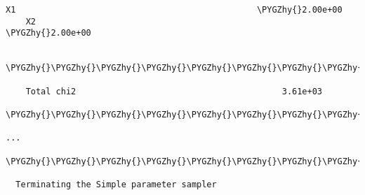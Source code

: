 \documentclass[letterpaper,10pt,english]{sphinxmanual}
\def\PYGZhy{\char`\-}
\begin{document}
\begin{Verbatim}[commandchars=\\\{\}]
    X1                                                \PYGZhy{}2.00e+00
    X2                                                \PYGZhy{}2.00e+00

    \PYGZhy{}\PYGZhy{}\PYGZhy{}\PYGZhy{}\PYGZhy{}\PYGZhy{}\PYGZhy{}\PYGZhy{}\PYGZhy{}\PYGZhy{}\PYGZhy{}\PYGZhy{}\PYGZhy{}\PYGZhy{}\PYGZhy{}\PYGZhy{}\PYGZhy{}\PYGZhy{}\PYGZhy{}\PYGZhy{}\PYGZhy{}\PYGZhy{}\PYGZhy{}\PYGZhy{}\PYGZhy{}\PYGZhy{}\PYGZhy{}\PYGZhy{}\PYGZhy{}\PYGZhy{}\PYGZhy{}\PYGZhy{}\PYGZhy{}\PYGZhy{}\PYGZhy{}\PYGZhy{}\PYGZhy{}\PYGZhy{}\PYGZhy{}\PYGZhy{}\PYGZhy{}\PYGZhy{}\PYGZhy{}\PYGZhy{}\PYGZhy{}\PYGZhy{}\PYGZhy{}\PYGZhy{}\PYGZhy{}\PYGZhy{}\PYGZhy{}\PYGZhy{}\PYGZhy{}\PYGZhy{}\PYGZhy{}\PYGZhy{}\PYGZhy{}\PYGZhy{}\PYGZhy{}

    Total chi2                                         3.61e+03

\PYGZhy{}\PYGZhy{}\PYGZhy{}\PYGZhy{}\PYGZhy{}\PYGZhy{}\PYGZhy{}\PYGZhy{}\PYGZhy{}\PYGZhy{}\PYGZhy{}\PYGZhy{}\PYGZhy{}\PYGZhy{}\PYGZhy{}\PYGZhy{}\PYGZhy{}\PYGZhy{}\PYGZhy{}\PYGZhy{}\PYGZhy{}\PYGZhy{}\PYGZhy{}\PYGZhy{}\PYGZhy{}\PYGZhy{}\PYGZhy{}\PYGZhy{}\PYGZhy{}\PYGZhy{}\PYGZhy{}\PYGZhy{}\PYGZhy{}\PYGZhy{}\PYGZhy{}\PYGZhy{}\PYGZhy{}\PYGZhy{}\PYGZhy{}\PYGZhy{}\PYGZhy{}\PYGZhy{}\PYGZhy{}\PYGZhy{}\PYGZhy{}\PYGZhy{}\PYGZhy{}\PYGZhy{}\PYGZhy{}\PYGZhy{}\PYGZhy{}\PYGZhy{}\PYGZhy{}\PYGZhy{}\PYGZhy{}\PYGZhy{}\PYGZhy{}\PYGZhy{}\PYGZhy{}\PYGZhy{}\PYGZhy{}\PYGZhy{}\PYGZhy{}\PYGZhy{}\PYGZhy{}\PYGZhy{}\PYGZhy{}\PYGZhy{}\PYGZhy{}\PYGZhy{}\PYGZhy{}\PYGZhy{}\PYGZhy{}\PYGZhy{}\PYGZhy{}\PYGZhy{}\PYGZhy{}\PYGZhy{}\PYGZhy{}\PYGZhy{}\PYGZhy{}\PYGZhy{}\PYGZhy{}\PYGZhy{}\PYGZhy{}\PYGZhy{}\PYGZhy{}

...

\PYGZhy{}\PYGZhy{}\PYGZhy{}\PYGZhy{}\PYGZhy{}\PYGZhy{}\PYGZhy{}\PYGZhy{}\PYGZhy{}\PYGZhy{}\PYGZhy{}\PYGZhy{}\PYGZhy{}\PYGZhy{}\PYGZhy{}\PYGZhy{}\PYGZhy{}\PYGZhy{}\PYGZhy{}\PYGZhy{}\PYGZhy{}\PYGZhy{}\PYGZhy{}\PYGZhy{}\PYGZhy{}\PYGZhy{}\PYGZhy{}\PYGZhy{}\PYGZhy{}\PYGZhy{}\PYGZhy{}\PYGZhy{}\PYGZhy{}\PYGZhy{}\PYGZhy{}\PYGZhy{}\PYGZhy{}\PYGZhy{}\PYGZhy{}\PYGZhy{}\PYGZhy{}\PYGZhy{}\PYGZhy{}\PYGZhy{}\PYGZhy{}\PYGZhy{}\PYGZhy{}\PYGZhy{}\PYGZhy{}\PYGZhy{}\PYGZhy{}\PYGZhy{}\PYGZhy{}\PYGZhy{}\PYGZhy{}\PYGZhy{}\PYGZhy{}\PYGZhy{}\PYGZhy{}\PYGZhy{}\PYGZhy{}\PYGZhy{}\PYGZhy{}\PYGZhy{}\PYGZhy{}\PYGZhy{}\PYGZhy{}\PYGZhy{}\PYGZhy{}\PYGZhy{}\PYGZhy{}\PYGZhy{}\PYGZhy{}\PYGZhy{}\PYGZhy{}\PYGZhy{}\PYGZhy{}\PYGZhy{}\PYGZhy{}\PYGZhy{}\PYGZhy{}\PYGZhy{}\PYGZhy{}\PYGZhy{}\PYGZhy{}\PYGZhy{}\PYGZhy{}

  Terminating the Simple parameter sampler


\end{Verbatim}
\end{document}
